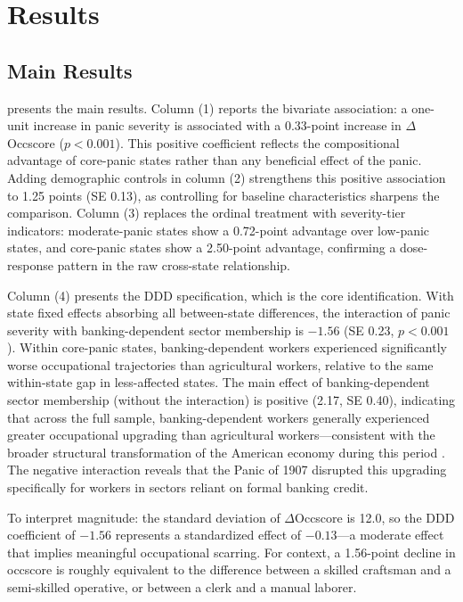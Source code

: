 \documentclass[12pt]{article}
\begin{document}
\section{Results}

\subsection{Main Results}

 presents the main results. Column (1) reports the bivariate association: a one-unit increase in panic severity is associated with a 0.33-point increase in $\Delta$Occscore ($p < 0.001$). This positive coefficient reflects the compositional advantage of core-panic states rather than any beneficial effect of the panic. Adding demographic controls in column (2) strengthens this positive association to 1.25 points (SE 0.13), as controlling for baseline characteristics sharpens the comparison. Column (3) replaces the ordinal treatment with severity-tier indicators: moderate-panic states show a 0.72-point advantage over low-panic states, and core-panic states show a 2.50-point advantage, confirming a dose-response pattern in the raw cross-state relationship.

Column (4) presents the DDD specification, which is the core identification. With state fixed effects absorbing all between-state differences, the interaction of panic severity with banking-dependent sector membership is $-1.56$ (SE 0.23, $p < 0.001$). Within core-panic states, banking-dependent workers experienced significantly worse occupational trajectories than agricultural workers, relative to the same within-state gap in less-affected states. The main effect of banking-dependent sector membership (without the interaction) is positive (2.17, SE 0.40), indicating that across the full sample, banking-dependent workers generally experienced greater occupational upgrading than agricultural workers---consistent with the broader structural transformation of the American economy during this period \citep{goldin2008race}. The negative interaction reveals that the Panic of 1907 disrupted this upgrading specifically for workers in sectors reliant on formal banking credit.



To interpret magnitude: the standard deviation of $\Delta$Occscore is 12.0, so the DDD coefficient of $-1.56$ represents a standardized effect of $-0.13$---a moderate effect that implies meaningful occupational scarring. For context, a 1.56-point decline in occscore is roughly equivalent to the difference between a skilled craftsman and a semi-skilled operative, or between a clerk and a manual laborer.
\end{document}
